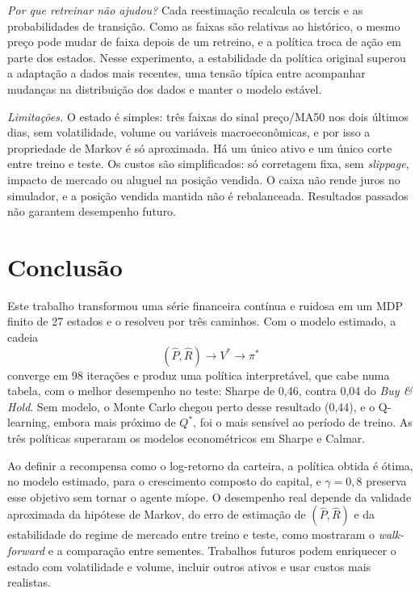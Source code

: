 \documentclass[conference]{IEEEtran}
\begin{document}
\textit{Por que retreinar não ajudou?} Cada reestimação recalcula os tercis e as probabilidades de transição. Como as faixas são relativas ao histórico, o mesmo preço pode mudar de faixa depois de um retreino, e a política troca de ação em parte dos estados. Nesse experimento, a estabilidade da política original superou a adaptação a dados mais recentes, uma tensão típica entre acompanhar mudanças na distribuição dos dados e manter o modelo estável.

\textit{Limitações.} O estado é simples: três faixas do sinal preço/MA50 nos dois últimos dias, sem volatilidade, volume ou variáveis macroeconômicas, e por isso a propriedade de Markov é só aproximada. Há um único ativo e um único corte entre treino e teste. Os custos são simplificados: só corretagem fixa, sem \textit{slippage}, impacto de mercado ou aluguel na posição vendida. O caixa não rende juros no simulador, e a posição vendida mantida não é rebalanceada. Resultados passados não garantem desempenho futuro.

\section{Conclusão}
\label{sec:conclusao}

Este trabalho transformou uma série financeira contínua e ruidosa em um MDP finito de 27 estados e o resolveu por três caminhos. Com o modelo estimado, a cadeia
\begin{equation}
  (\hat{P}, \hat{R}) \longrightarrow V^* \longrightarrow \pi^*
\end{equation}
converge em 98 iterações e produz uma política interpretável, que cabe numa tabela, com o melhor desempenho no teste: Sharpe de 0,46, contra 0,04 do \textit{Buy \& Hold}. Sem modelo, o Monte Carlo chegou perto desse resultado (0,44), e o Q-learning, embora mais próximo de $Q^*$, foi o mais sensível ao período de treino. As três políticas superaram os modelos econométricos em Sharpe e Calmar.

Ao definir a recompensa como o log-retorno da carteira, a política obtida é ótima, no modelo estimado, para o crescimento composto do capital, e $\gamma = 0{,}8$ preserva esse objetivo sem tornar o agente míope. O desempenho real depende da validade aproximada da hipótese de Markov, do erro de estimação de $(\hat{P}, \hat{R})$ e da estabilidade do regime de mercado entre treino e teste, como mostraram o \textit{walk-forward} e a comparação entre sementes. Trabalhos futuros podem enriquecer o estado com volatilidade e volume, incluir outros ativos e usar custos mais realistas.
\end{document}
